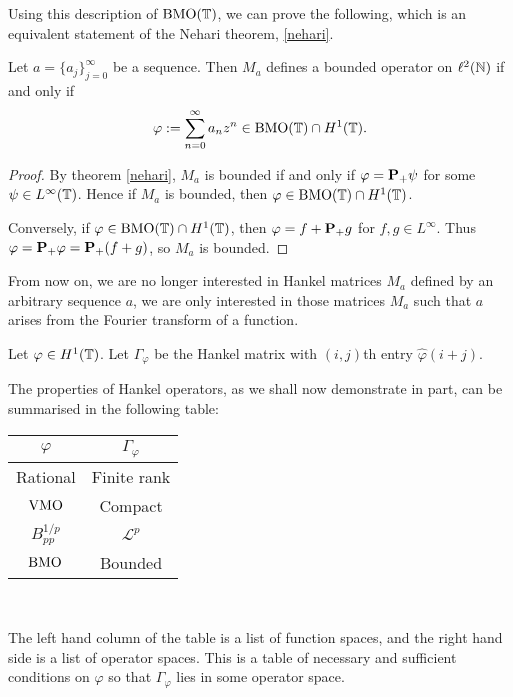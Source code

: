 Using this description of $\operatorname{BMO}(\mathbb{T})$, we can prove the following,
which is an equivalent statement of the Nehari theorem, \ref{nehari}.
\begin{corollary}
    Let $a = \{a_j\}_{j=0}^\infty$ be a sequence. Then $M_a$ defines
    a bounded operator on $\ell^2(\mathbb{N})$ if and only if
    \begin{equation}
        \varphi := \sum_{n=0}^\infty a_n z^n \in \operatorname{BMO}(\mathbb{T})\cap H^1(\mathbb{T}).
    \end{equation}
\end{corollary}
\begin{proof}
    By theorem \ref{nehari}, $M_a$ is bounded if and only if $\varphi = \mathbf{P}_+\psi$
    for some $\psi \in L^\infty(\mathbb{T})$. Hence if $M_a$ is bounded,
    then $\varphi \in \operatorname{BMO}(\mathbb{T})\cap H^1(\mathbb{T})$. 
    
    Conversely, if $\varphi \in \operatorname{BMO}(\mathbb{T})\cap H^1(\mathbb{T})$,
    then $\varphi = f+\mathbf{P}_+g$ for $f,g \in L^\infty$. Thus
    $\varphi = \mathbf{P}_+\varphi = \mathbf{P}_+(f+g)$, so $M_a$ is bounded.
\end{proof}

From now on, we are no longer interested in Hankel matrices $M_a$ defined by an arbitrary
sequence $a$, we are only interested in those matrices $M_a$ such that $a$
arises from the Fourier transform of a function. 
\begin{definition}
    Let $\varphi \in H^1(\mathbb{T})$. Let $\Gamma_\varphi$
    be the Hankel matrix with $(i,j)$th entry $\hat{\varphi}(i+j)$.
\end{definition}

The properties of Hankel operators, as we shall now demonstrate in part, can be summarised
in the following table: \\
\begin{center}
\begin{tabular}{|c|c|}
\hline
$\varphi$ & $\Gamma_\varphi$\\
\hline
Rational & Finite rank\\
$\operatorname{VMO}$ & Compact\\
$B_{pp}^{1/p}$ & $\mathcal{L}^p$\\
$\operatorname{BMO}$ & Bounded\\
\hline
\end{tabular}\\
\end{center}
The left hand column of the table is a list of function spaces,
and the right hand side is a list of operator spaces. This is a table
of necessary and sufficient conditions on $\varphi$ so that $\Gamma_\varphi$
lies in some operator space.


